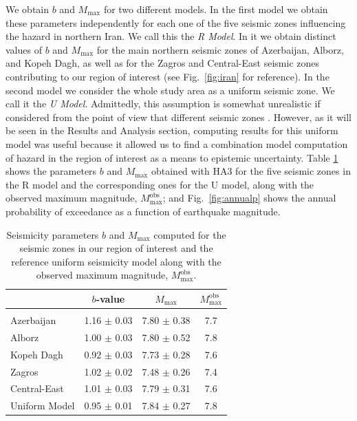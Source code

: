 We obtain $b$ and $M_{\max}$ for two different models. In the first model we obtain these parameters independently for each one of the five seismic zones influencing the hazard in northern Iran. We call this the \textit{R Model}. In it we obtain distinct values of $b$ and $M_{\max}$ for the main northern seismic zones of Azerbaijan, Alborz, and Kopeh Dagh, as well as for the Zagros and Central-East seismic zones contributing to our region of interest (see Fig.~\ref{fig:iran} for reference). In the second model we consider the whole study area as a uniform seismic zone. We call it the \textit{U Model}. Admittedly, this assumption is somewhat unrealistic if considered from the point of view that different seismic zones . However, as it will be seen in the Results and Analysis section, computing results for this uniform model was useful because it allowed us to find a combination model computation of hazard in the region of interest as a means to  epistemic uncertainty. Table \ref{tab:params} shows the parameters $b$ and $M_{\max}$ obtained with HA3 for the five seismic zones in the R model and the corresponding ones for the U model, along with the observed maximum magnitude, $M_{\max}^{\mathrm{obs}}$; and Fig.~\ref{fig:annualp} shows the annual probability of exceedance as a function of earthquake magnitude.

\begin{table}%
    \centering
    \caption{Seismicity parameters $b$ and $M_{\max}$ computed for the seismic zones in our region of interest and the reference uniform seismicity model along with the observed maximum magnitude, $M_{\max}^{\mathrm{obs}}$.}
    \begin{tabular}{@{\hspace{0.2ex}}lccc@{\hspace{0.2ex}}}
        \cline{2-4}                                                                         \\[-1.6ex]
                        & $b$-value         & $M_{\max}$        & $M_{\max}^{\mathrm{obs}}$ \\[0.6ex]
        \hline                                                                              \\[-1.6ex]
        Azerbaijan      & 1.16 $\pm$ 0.03   & 7.80 $\pm$ 0.38   & 7.7                       \\
        Alborz          & 1.00 $\pm$ 0.03   & 7.80 $\pm$ 0.52   & 7.8                       \\
        Kopeh Dagh      & 0.92 $\pm$ 0.03   & 7.73 $\pm$ 0.28   & 7.6                       \\
        Zagros          & 1.02 $\pm$ 0.02   & 7.48 $\pm$ 0.26   & 7.4                       \\
        Central-East    & 1.01 $\pm$ 0.03   & 7.79 $\pm$ 0.31   & 7.6                       \\
        Uniform Model   & 0.95 $\pm$ 0.01   & 7.84 $\pm$ 0.27   & 7.8                       \\[0.5ex]
        \hline 
    \end{tabular}
    \label{tab:params} 
\end{table}

